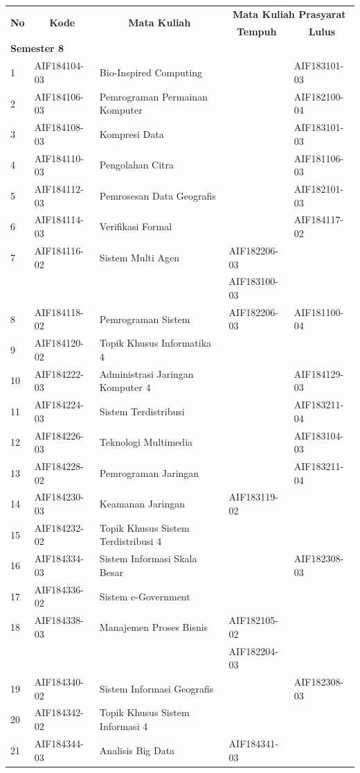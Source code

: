 \documentclass[a4paper,twoside]{article}
\begin{document}
\begin{enumerate}
\begin{enumerate}
\begin{table}[H]
	\centering
		\begin{tabular}{|p{0.5cm}|p{2.85cm}|p{4.95cm}|p{2.7cm}|p{2.7cm}|}
			\hline
			\multicolumn{1}{|c|}{\multirow{2}{*}{\textbf{No}}} & \multicolumn{1}{c|}{\multirow{2}{*}{\textbf{Kode}}} & \multicolumn{1}{c|}{\multirow{2}{*}{\textbf{Mata Kuliah}}} & \multicolumn{2}{c|}{\textbf{Mata Kuliah Prasyarat}} \\ \cline{4-5}
			 &  &  & \multicolumn{1}{c|}{\textbf{Tempuh}} & \multicolumn{1}{c|}{\textbf{Lulus}} \\ \hline
\multicolumn{5}{|l|}{\textbf{Semester 8}} \\ \hline
1 & AIF184104-03 & Bio-Inspired Computing &  & AIF183101-03 \\ \hline
2 & AIF184106-03 & Pemrograman Permainan Komputer &  & AIF182100-04 \\ \hline
3 & AIF184108-03 & Kompresi Data &  & AIF183101-03 \\ \hline
4 & AIF184110-03 & Pengolahan Citra &  & AIF181106-03 \\ \hline
5 & AIF184112-03 & Pemrosesan Data Geografis &  & AIF182101-03 \\ \hline
6 & AIF184114-03 & Verifikasi Formal &  & AIF184117-02 \\ \hline
7 & AIF184116-02 & Sistem Multi Agen & AIF182206-03 &  \\
 &  &  & AIF183100-03 &  \\ \hline
8 & AIF184118-02 & Pemrograman Sistem & AIF182206-03 & AIF181100-04 \\ \hline
9 & AIF184120-02 & Topik Khusus Informatika 4 &  &  \\ \hline
10 & AIF184222-03 & Administrasi Jaringan Komputer 4 &  & AIF184129-03 \\ \hline
11 & AIF184224-03 & Sistem Terdistribusi &  & AIF183211-04 \\ \hline
12 & AIF184226-03 & Teknologi Multimedia &  & AIF183104-03 \\ \hline
13 & AIF184228-02 & Pemrograman Jaringan &  & AIF183211-04 \\ \hline
14 & AIF184230-03 & Keamanan Jaringan & AIF183119-02 &  \\ \hline
15 & AIF184232-02 & Topik Khusus Sistem Terdistribusi 4 &  &  \\ \hline
16 & AIF184334-03 & Sistem Informasi Skala Besar &  & AIF182308-03 \\ \hline
17 & AIF184336-02 & Sistem e-Government &  &  \\ \hline
18 & AIF184338-03 & Manajemen Proses Bisnis & AIF182105-02 &  \\
 &  &  & AIF182204-03 &  \\ \hline
19 & AIF184340-02 & Sistem Informasi Geografis &  & AIF182308-03 \\ \hline
20 & AIF184342-02 & Topik Khusus Sistem Informasi 4 &  &  \\ \hline
21 & AIF184344-03 & Analisis Big Data & AIF184341-03 & \\  \hline
		\end{tabular}
	\label{tab:DaftarMataKuliahPilihanDanPrasyaratnya3}
\end{table}


\end{enumerate}
\end{enumerate}
\end{document}
